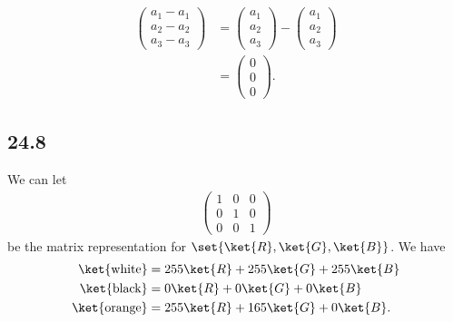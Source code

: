 \documentclass[12pt]{mypackage}
\begin{document}
\begin{enumerate}[(a)]
    \begin{align*}
      \begin{pmatrix}a_1 - a_1\\a_2 - a_2\\a_3 - a_3\end{pmatrix} &= \begin{pmatrix}a_1\\a_2\\a_3\end{pmatrix}  - \begin{pmatrix}a_1\\a_2\\a_3\end{pmatrix}\\
                                                                  &= \begin{pmatrix}0\\0\\0\end{pmatrix}.
    \end{align*}
\end{enumerate}
\subsection{24.8}%
We can let
\begin{align*}
  \begin{pmatrix}1 &0 & 0 \\ 0 & 1 & 0 \\ 0 & 0 & 1\end{pmatrix}
\end{align*}
be the matrix representation for $\set{ \ket{R}, \ket{G}, \ket{B}  }$. We have
\begin{align*}
  \ket{\text{white}} &= 255 \ket{R} + 255 \ket{G} + 255 \ket{B}\\
  \ket{\text{black}} &= 0 \ket{R} + 0 \ket{G} + 0 \ket{B}\\
  \ket{\text{orange}} &= 255 \ket{R} + 165 \ket{G} + 0 \ket{B}.
\end{align*}
\end{document}
